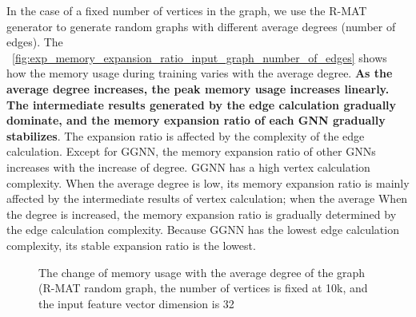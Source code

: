 In the case of a fixed number of vertices in the graph, we use the R-MAT generator to generate random graphs with different average degrees (number of edges).
The \figurename~\ref{fig:exp_memory_expansion_ratio_input_graph_number_of_edges} shows how the memory usage during training varies with the average degree.
\textbf{As the average degree increases, the peak memory usage increases linearly.
The intermediate results generated by the edge calculation gradually dominate, and the memory expansion ratio of each GNN gradually stabilizes}. 
The expansion ratio is affected by the complexity of the edge calculation.
Except for GGNN, the memory expansion ratio of other GNNs increases with the increase of degree. GGNN has a high vertex calculation complexity.
When the average degree is low, its memory expansion ratio is mainly affected by the intermediate results of vertex calculation;
when the average When the degree is increased, the memory expansion ratio is gradually determined by the edge calculation complexity.
Because GGNN has the lowest edge calculation complexity, its stable expansion ratio is the lowest.

\begin{figure}
    \centering
    \caption{The change of memory usage with the average degree of the graph (R-MAT random graph, the number of vertices is fixed at 10k, and the input feature vector dimension is 32}
    \label{fig:exp_memory_expension_ratio_input_feature_dimension}
\end{figure}

